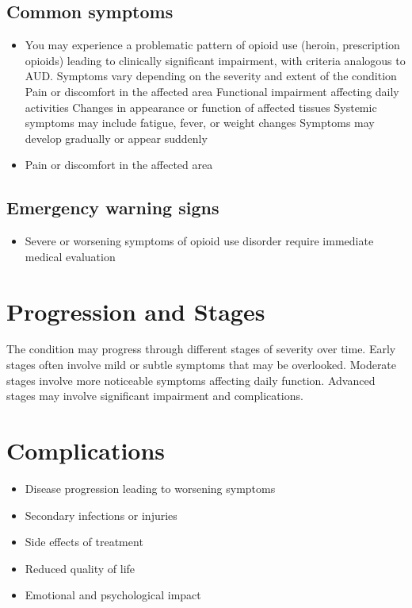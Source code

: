 \subsection{Common symptoms}
\begin{itemize}[noitemsep]
  \item You may experience a problematic pattern of opioid use (heroin, prescription opioids) leading to clinically significant impairment, with criteria analogous to AUD. Symptoms vary depending on the severity and extent of the condition Pain or discomfort in the affected area Functional impairment affecting daily activities Changes in appearance or function of affected tissues Systemic symptoms may include fatigue, fever, or weight changes Symptoms may develop gradually or appear suddenly
  \item Pain or discomfort in the affected area
  \end{itemize}

\subsection{Emergency warning signs}
\begin{itemize}[noitemsep]
  \item Severe or worsening symptoms of opioid use disorder require immediate medical evaluation
\end{itemize}
\section{Progression and Stages}
The condition may progress through different stages of severity over time. Early stages often involve mild or subtle symptoms that may be overlooked. Moderate stages involve more noticeable symptoms affecting daily function. Advanced stages may involve significant impairment and complications.
\section{Complications}
\begin{itemize}[noitemsep]
  \item Disease progression leading to worsening symptoms
  \item Secondary infections or injuries
  \item Side effects of treatment
  \item Reduced quality of life
  \item Emotional and psychological impact
\end{itemize}
